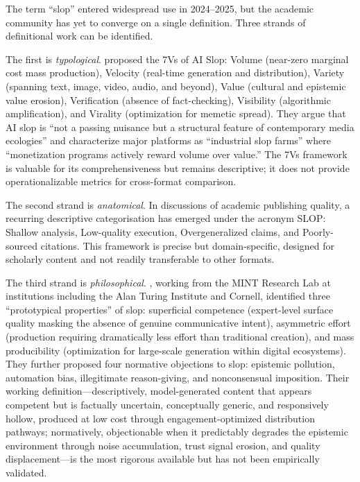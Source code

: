 \documentclass[12pt,a4paper]{article}
\begin{document}
The term ``slop'' entered widespread use in 2024--2025, but the academic community has yet to converge on a single definition. Three strands of definitional work can be identified.

The first is \emph{typological}. \textcite{MadsenPuyt2025} proposed the 7Vs of AI Slop: Volume (near-zero marginal cost mass production), Velocity (real-time generation and distribution), Variety (spanning text, image, video, audio, and beyond), Value (cultural and epistemic value erosion), Verification (absence of fact-checking), Visibility (algorithmic amplification), and Virality (optimization for memetic spread). They argue that AI slop is ``not a passing nuisance but a structural feature of contemporary media ecologies'' and characterize major platforms as ``industrial slop farms'' where ``monetization programs actively reward volume over value.'' The 7Vs framework is valuable for its comprehensiveness but remains descriptive; it does not provide operationalizable metrics for cross-format comparison.

The second strand is \emph{anatomical}. In discussions of academic publishing quality, a recurring descriptive categorisation has emerged under the acronym SLOP: Shallow analysis, Low-quality execution, Overgeneralized claims, and Poorly-sourced citations. This framework is precise but domain-specific, designed for scholarly content and not readily transferable to other formats.

The third strand is \emph{philosophical}. \textcite{Kommers2025}, working from the MINT Research Lab at institutions including the Alan Turing Institute and Cornell, identified three ``prototypical properties'' of slop: superficial competence (expert-level surface quality masking the absence of genuine communicative intent), asymmetric effort (production requiring dramatically less effort than traditional creation), and mass producibility (optimization for large-scale generation within digital ecosystems). They further proposed four normative objections to slop: epistemic pollution, automation bias, illegitimate reason-giving, and nonconsensual imposition. Their working definition---descriptively, model-generated content that appears competent but is factually uncertain, conceptually generic, and responsively hollow, produced at low cost through engagement-optimized distribution pathways; normatively, objectionable when it predictably degrades the epistemic environment through noise accumulation, trust signal erosion, and quality displacement---is the most rigorous available but has not been empirically validated.
\end{document}
